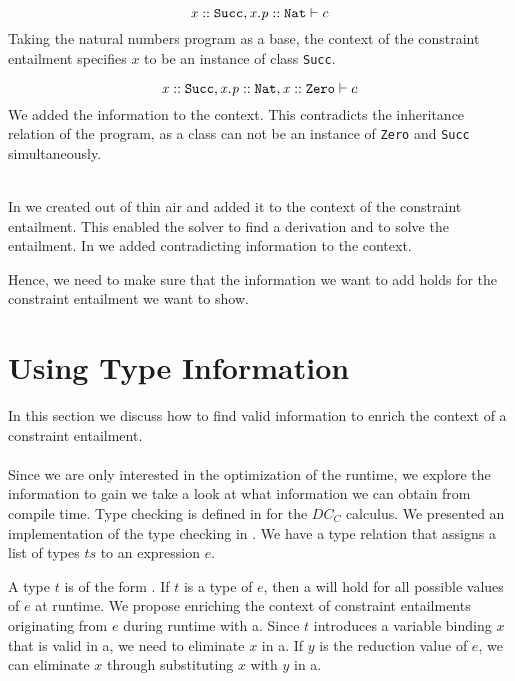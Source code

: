 \begin{example}
\label{ex:enrich-context-contra}\quad\\
\[  \mathit{x} :: \mathit{\texttt{Succ}}, \mathit{x.p} :: \mathit{\texttt{Nat}}  \vdash c \]
Taking the natural numbers program as a base,
the context of the constraint entailment specifies $x$ to be
an instance of class \texttt{Succ}.
        
\[  \mathit{x} :: \mathit{\texttt{Succ}}, \mathit{x.p} :: \mathit{\texttt{Nat}}, \mathit{x} :: \mathit{\texttt{Zero}}  \vdash c \]
We added the information  to the context.
This contradicts the inheritance relation of the program,
as a class can not be an instance of \texttt{Zero} and \texttt{Succ} simultaneously.
\end{example}
\quad\\
%
In 
we created  out of thin air
and added it to the context of the constraint entailment.
This enabled the solver to find a derivation and to solve
the entailment.
In 
we added contradicting information to the context.

Hence, we need to make sure that the information
we want to add holds for the constraint entailment
we want to show.
\newpage

\section{Using Type Information}
In this section we discuss how to find valid
information to enrich the context of a constraint entailment.\\
\\
Since we are only interested in the optimization of the runtime,
we explore the information to gain %
we take a look at what information we can obtain from compile time.
Type checking is defined in  for the $DC_C$ calculus.
We presented an implementation of the type checking in .
We have a type relation that assigns a list of types $ts$ to an expression $e$.

A type $t$ is of the form .
If $t$ is a type of $e$, then \ovl a will hold for all
possible values of $e$ at runtime.
We propose enriching the context of constraint entailments
originating from $e$ during runtime with \ovl a.
Since $t$ introduces a variable binding $x$ that is valid
in \ovl a, we need to eliminate $x$ in \ovl a.
If $y$ is the reduction value of $e$,
we can eliminate $x$ through
substituting $x$ with $y$ in \ovl a.

